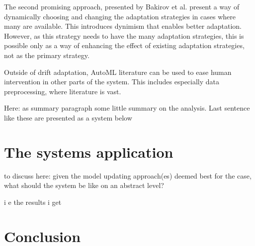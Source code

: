 The second promising approach, presented by Bakirov et al. \cite{bakirov_automated_2021} present a way of dynamically choosing and changing the adaptation strategies in cases where many are available. This introduces dynimism that enables better adaptation. However, as this strategy needs to have the many adaptation strategies, this is possible only as a way of enhancing the effect of existing adaptation strategies, not as the primary strategy.

Outside of drift adaptation, AutoML literature can be used to ease human intervention in other parts of the system. This includes especially data preprocessing, where literature is vast.





Here: as summary paragraph some little summary on the analysis. Last sentence like these are presented as a system below

\chapter{The systems application}

to discuss here: given the model updating approach(es) deemed best for the case, what should the system be like on an abstract level?

i e the results i get


\chapter{Conclusion}

